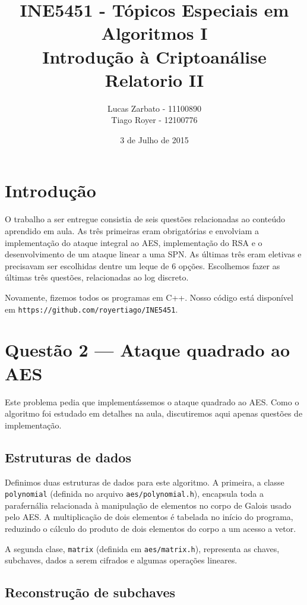 \documentclass{article}
\title{
    INE5451 - Tópicos Especiais em Algoritmos I \\
    Introdução à Criptoanálise \\
    Relatorio II
}
\author{
    Lucas Zarbato - 11100890\\
    Tiago Royer - 12100776
}
\date{3 de Julho de 2015}
\begin{document}
\maketitle

\section{Introdução}

O trabalho a ser entregue consistia de seis questões
relacionadas ao conteúdo aprendido em aula.
As três primeiras eram obrigatórias
e envolviam a implementação do ataque integral ao AES,
implementação do RSA
e o desenvolvimento de um ataque linear a uma SPN.
As últimas três eram eletivas e precisavam ser escolhidas
dentre um leque de 6 opções.
Escolhemos fazer as últimas três questões, relacionadas ao log discreto.

Novamente, fizemos todos os programas em C++.
Nosso código está disponível em \texttt{https://github.com/royertiago/INE5451}.

\section{Questão 2 --- Ataque quadrado ao AES}

Este problema pedia que implementássemos o ataque quadrado ao AES.
Como o algoritmo foi estudado em detalhes na aula,
discutiremos aqui apenas questões de implementação.

\subsection{Estruturas de dados}

Definimos duas estruturas de dados para este algoritmo.
A primeira,
a classe \verb"polynomial"
(definida no arquivo \verb"aes/polynomial.h"),
encapsula toda a parafernália relacionada
à manipulação de elementos no corpo de Galois usado pelo AES.
A multiplicação de dois elementos é tabelada no início do programa,
reduzindo o cálculo do produto de dois elementos do corpo
a um acesso a vetor.

A segunda clase,
\verb"matrix" (definida em \verb"aes/matrix.h"),
representa as chaves, subchaves, dados a serem cifrados
e algumas operações lineares.

\subsection{Reconstrução de subchaves}
\end{document}
